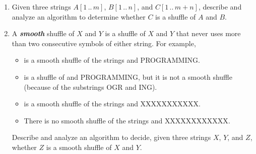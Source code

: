 \begin{enumerate}[label=\arabic*.,ref=\thechapter.\arabic*,leftmargin=*,align=left,widest*=99,itemsep=1.5ex plus 0.5ex]
\begin{enumerate}
\item Given three strings $A[1\,..\,m]$, $B[1\,..\,n]$, and $C[1\,..\,m+n]$, describe and analyze an algorithm to determine whether $C$ is a shuffle of $A$ and $B$.
\item A \textbf{\textit{smooth}} shuffle of $X$ and $Y$ is a shuffle of $X$ and $Y$ that never uses more than two consecutive symbols of either string.
For example,
\begin{itemize}
\item \mbox{} is a smooth shuffle of the strings  and {\color{JEcyan}\ttfamily PROGRAMMING}.
\item \mbox{} is a shuffle of  and {\color{JEcyan}\ttfamily PROGRAMMING}, but it is not a smooth shuffle (because of the substrings {\color{JEcyan}\ttfamily OGR} and {\color{JEcyan}\ttfamily ING}).
\item \mbox{} is a smooth shuffle of the strings  and {\color{JEcyan}\ttfamily XXXXXXXXXXX}.
\item There is no smooth shuffle of the strings  and {\color{JEcyan}\ttfamily XXXXXXXXXXXX}.
\end{itemize}
Describe and analyze an algorithm to decide, given three strings $X$, $Y$, and $Z$, whether $Z$ is a smooth shuffle of $X$ and $Y$.
\end{enumerate}


\end{enumerate}
